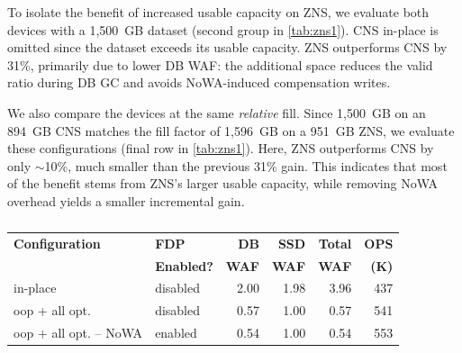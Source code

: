 To isolate the benefit of increased usable capacity on ZNS, we evaluate both devices with a 1{,}500~GB dataset (second group in \cref{tab:zns1}).
CNS in-place is omitted since the dataset exceeds its usable capacity.
ZNS outperforms CNS by 31\%, primarily due to lower DB WAF: the additional space reduces the valid ratio during DB GC and avoids NoWA-induced compensation writes.

We also compare the devices at the same \emph{relative} fill.
Since 1{,}500~GB on an 894~GB CNS matches the fill factor of 1{,}596~GB on a 951~GB ZNS, we evaluate these configurations (final row in \cref{tab:zns1}).
Here, ZNS outperforms CNS by only $\sim$10\%, much smaller than the previous 31\% gain.
This indicates that most of the benefit stems from ZNS’s larger usable capacity, while removing NoWA overhead yields a smaller incremental gain.


\begin{table}[t]
\setlength\doublerulesep{0.5pt}
\setlength{\tabcolsep}{0.14cm}
\small
\centering
\caption{}
\label{tab:fdpresults}
\vspace{-3mm} 
\begin{tabular}{l l |rrrr}
\toprule[1pt]\midrule[0.3pt]
\textbf{Configuration} & \textbf{FDP} & \textbf{DB} & \textbf{SSD} & \textbf{Total} & \textbf{OPS} \\
\textbf{} & \textbf{Enabled?} & \textbf{WAF} & \textbf{WAF} & \textbf{WAF} & \textbf{(K)} \\
\midrule
in-place                  & disabled & 2.00 & 1.98 & 3.96 & 437 \\
oop + all opt.            & disabled & 0.57 & 1.00 & 0.57 & 541 \\
oop + all opt. -- NoWA    & enabled  & 0.54 & 1.00 & 0.54 & 553 \\
\midrule[0.3pt]\bottomrule[1pt]
\end{tabular}
\end{table}




